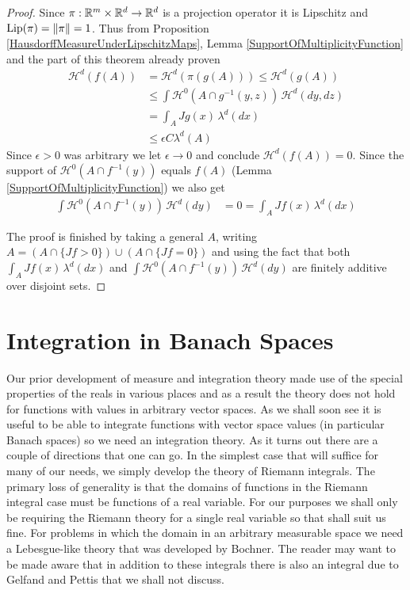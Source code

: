 \begin{proof}
Since $\pi : \mathbb{R}^m \times \mathbb{R}^d \to \mathbb{R}^d$ is a projection operator it is Lipschitz and $\operatorname*{Lip}(\pi) = \left \lVert \pi \right \rVert = 1$.  Thus from Proposition \ref{HausdorffMeasureUnderLipschitzMaps},
Lemma \ref{SupportOfMultiplicityFunction}
and the part of this theorem already proven
\begin{align*}
\mathcal{H}^d(f(A)) &= \mathcal{H}^d(\pi(g(A))) \leq \mathcal{H}^d(g(A)) \\
&\leq \int \mathcal{H}^0(A \cap g^{-1}(y,z)) \, \mathcal{H}^d(dy,dz) \\
&=\int_A Jg(x) \, \lambda^d(dx) \\
&\leq \epsilon C \lambda^d(A)
\end{align*}
Since $\epsilon>0$ was arbitrary we let $\epsilon \to 0$ and conclude $\mathcal{H}^d(f(A))=0$.  Since the support of $\mathcal{H}^0(A \cap f^{-1}(y))$ equals $f(A)$ (Lemma \ref{SupportOfMultiplicityFunction}) we also get
\begin{align*}
\int \mathcal{H}^0(A \cap f^{-1}(y)) \, \mathcal{H}^d(dy) &= 0 = \int_A Jf(x) \, \lambda^d(dx)
\end{align*}

The proof is finished by taking a general $A$, writing $A = (A \cap \lbrace Jf>0 \rbrace) \cup (A \cap \lbrace Jf = 0 \rbrace)$ and using the fact that both $\int_A Jf(x) \, \lambda^d(dx)$ and
$\int \mathcal{H}^0(A \cap f^{-1}(y)) \, \mathcal{H}^d(dy)$ are finitely additive over disjoint sets.
\end{proof}

\section{Integration in Banach Spaces}

Our prior development of measure and integration theory made use of the
special properties of the reals in various places and as a
result the theory does not hold for functions with values in arbitrary
vector spaces.  As we shall soon see it is useful to be able to
integrate functions with vector space values (in particular Banach
spaces) so we need an integration theory.  As it turns out there are a
couple of directions that one can go.  In the simplest case that will
suffice for many of our needs, we simply develop the theory of Riemann
integrals.  The primary loss of generality is
that the domains of functions in the Riemann integral case must be 
functions of a real variable.  For our purposes we shall only be
requiring the Riemann theory for a single real variable so that shall
suit us fine.  For problems in which the domain in an arbitrary
measurable space we need a Lebesgue-like theory that was developed by
Bochner.  The reader may want to be made aware that in addition to these integrals there is also an
integral due to Gelfand and Pettis that we shall not discuss.


